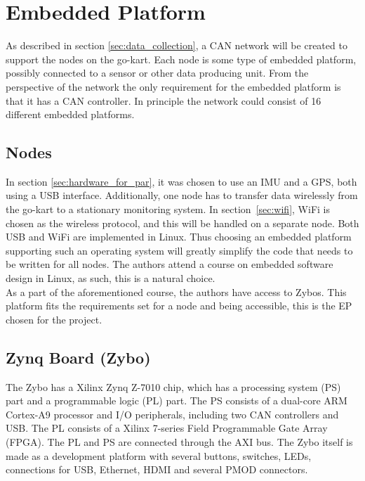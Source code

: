 
\section{Embedded Platform}\label{sec:EP}
As described in section \ref{sec:data_collection}, a CAN network will be created to support the nodes on the go-kart.
Each node is some type of embedded platform, possibly connected to a sensor or other data producing unit.
From the perspective of the network the only requirement for the embedded platform is that it has a CAN controller.
In principle the network could consist of 16 different embedded platforms.
\subsection{Nodes}
In section \ref{sec:hardware_for_par}, it was chosen to use an IMU and a GPS, both using a USB interface.
Additionally, one node has to transfer data wirelessly from the go-kart to a stationary monitoring system.
In section~\ref{sec:wifi}, WiFi is chosen as the wireless protocol, and this will be handled on a separate node.
Both USB and WiFi are implemented in Linux.
Thus choosing an embedded platform supporting such an operating system will greatly simplify the code that needs to be written for all nodes.
The authors attend a course on embedded software design in Linux, as such, this is a natural choice.\\

As a part of the aforementioned course, the authors have access to Zybos.
This platform fits the requirements set for a node and being accessible, this is the EP chosen for the project.

\subsection{Zynq Board (Zybo)}
The Zybo has a Xilinx Zynq Z-7010 chip, which has a processing system (PS) part and a programmable logic (PL) part.
The PS consists of a dual-core ARM Cortex-A9 processor and I/O peripherals, including two CAN controllers and USB.
The PL consists of a Xilinx 7-series Field Programmable Gate Array (FPGA). 
The PL and PS are connected through the AXI bus.
The Zybo itself is made as a development platform with several buttons, switches, LEDs, connections for USB, Ethernet, HDMI and several PMOD connectors.
